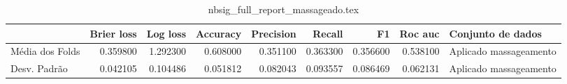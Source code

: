 \begin{table}
\centering
\caption{nbsig_full_report_massageado.tex}
\label{nbsig_full_report_massageado.tex}
\begin{tabular}{lrrrrrrrl}
\toprule
{} &  Brier  loss &  Log loss               &  Accuracy  &  Precision  &   Recall  &       F1  &  Roc auc  &       Conjunto de dados \\
\midrule
Média dos Folds &     0.359800 &  1.292300 &   0.608000 &    0.351100 &  0.363300 &  0.356600 &  0.538100 &  Aplicado massageamento \\
Desv. Padrão    &     0.042105 &  0.104486 &   0.051812 &    0.082043 &  0.093557 &  0.086469 &  0.062131 &  Aplicado massageamento \\
\bottomrule
\end{tabular}
\end{table}
